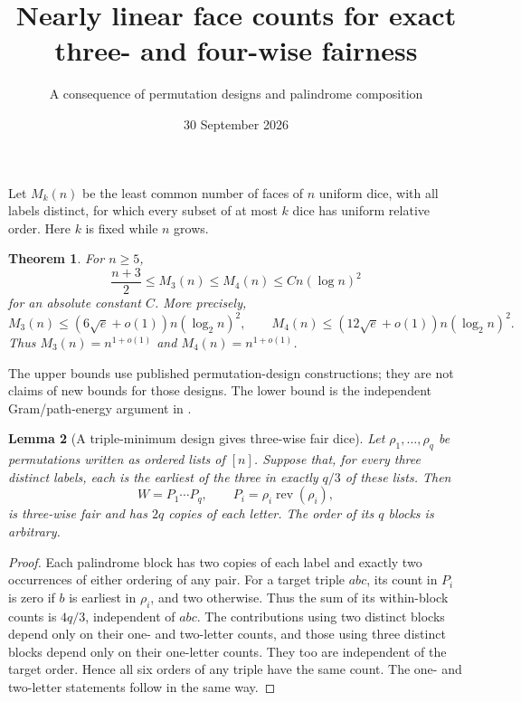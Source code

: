 \documentclass[11pt]{article}
\title{Nearly linear face counts for exact three- and four-wise fairness}
\author{A consequence of permutation designs and palindrome composition}
\date{30 September 2026}
\newtheorem{theorem}{Theorem}
\newtheorem{lemma}[theorem]{Lemma}
\begin{document}
\maketitle
Let $M_k(n)$ be the least common number of faces of $n$ uniform dice,
with all labels distinct, for which every subset of at most $k$ dice
has uniform relative order. Here $k$ is fixed while $n$ grows.
\begin{theorem}\label{main}
For $n\ge5$,
\[
 \frac{n+3}{2}\le M_3(n)\le M_4(n)\le Cn(\log n)^2
\]
for an absolute constant $C$. More precisely,
\[
 M_3(n)\le (6\sqrt e+o(1))n(\log_2n)^2,\qquad
 M_4(n)\le (12\sqrt e+o(1))n(\log_2n)^2.
\]
Thus $M_3(n)=n^{1+o(1)}$ and $M_4(n)=n^{1+o(1)}$.
\end{theorem}
The upper bounds use published permutation-design constructions; they
are not claims of new bounds for those designs. The lower bound is the
independent Gram/path-energy argument in
.

\begin{lemma}[A triple-minimum design gives three-wise fair dice]\label{pal}
Let $\rho_1,\ldots,\rho_q$ be permutations written as ordered lists of
$[n]$. Suppose that, for every three distinct labels, each is the earliest
of the three in exactly $q/3$ of these lists. Then
\[
 W=P_1\cdots P_q,\qquad P_i=\rho_i\operatorname{rev}(\rho_i),
\]
is three-wise fair and has $2q$ copies of each letter. The order of its
$q$ blocks is arbitrary.
\end{lemma}
\begin{proof}
Each palindrome block has two copies of each label and exactly two
occurrences of either ordering of any pair. For a target triple $abc$,
its count in $P_i$ is zero if $b$ is earliest in $\rho_i$, and two
otherwise. Thus the sum of its within-block counts is $4q/3$,
independent of $abc$.
The contributions using two distinct blocks depend only on their
one- and two-letter counts, and those using three distinct blocks depend
only on their one-letter counts. They too are independent of the target
order. Hence all six orders of any triple have the same count.
The one- and two-letter statements follow in the same way.
\end{proof}
\end{document}
